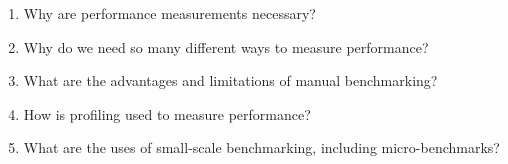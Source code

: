 \begin{enumerate}
\item Why are performance measurements necessary?
\item Why do we need so many different ways to measure performance?
\item What are the advantages and limitations of manual benchmarking?
\item How is profiling used to measure performance?
\item What are the uses of small-scale benchmarking, including micro-benchmarks?
\end{enumerate}